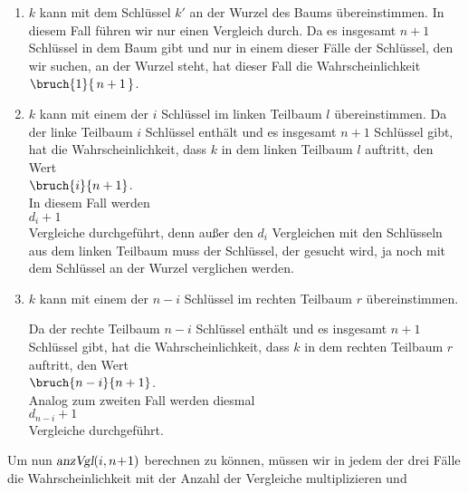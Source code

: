\begin{enumerate}
\item $k$ kann mit dem Schl\"ussel $k'$ an der Wurzel des Baums \"ubereinstimmen.
      In diesem Fall f\"uhren wir nur einen Vergleich durch.  Da es insgesamt
      $n+1$ Schl\"ussel in dem Baum gibt und nur in einem dieser F\"alle
      der Schl\"ussel, den wir suchen, an der Wurzel steht, hat dieser Fall die
      Wahrscheinlichkeit
      \\[0.2cm]
      \hspace*{1.3cm} $\bruch{1}{\,n+1\,}$.

\item $k$ kann mit einem der $i$ Schl\"ussel im linken Teilbaum $l$ \"ubereinstimmen.
      Da  der linke Teilbaum $i$ Schl\"ussel enth\"alt und  es insgesamt
      $n+1$ Schl\"ussel gibt, hat die Wahrscheinlichkeit, dass $k$ in dem linken Teilbaum $l$
      auftritt, den Wert \\[0.2cm]
      \hspace*{1.3cm} $\displaystyle\bruch{i}{n+1}$. \\[0.2cm]
       In diesem Fall werden \\[0.2cm]
      \hspace*{1.3cm} $\displaystyle d_i + 1$ \\[0.2cm]
      Vergleiche durchgef\"uhrt, denn au{\ss}er den $d_i$ Vergleichen mit den Schl\"usseln aus dem
      linken Teilbaum muss der Schl\"ussel, der gesucht wird, ja noch mit dem Schl\"ussel an
      der Wurzel verglichen werden.
\item $k$ kann mit einem der $n-i$ Schl\"ussel im rechten Teilbaum $r$ \"ubereinstimmen.

      Da  der rechte Teilbaum $n-i$ Schl\"ussel enth\"alt und  es insgesamt
      $n+1$ Schl\"ussel gibt, hat die Wahrscheinlichkeit, dass $k$ in dem rechten Teilbaum $r$
      auftritt, den Wert \\[0.2cm]
      \hspace*{1.3cm} $\displaystyle \bruch{n-i}{n+1}$. \\[0.2cm]
      Analog zum zweiten Fall werden diesmal \\[0.2cm]
      \hspace*{1.3cm} $\displaystyle d_{n-i} + 1$ \\[0.2cm]
      Vergleiche durchgef\"uhrt. 
\end{enumerate}
Um nun  $\textsl{anzVgl}(i, n\!+\!1)$ berechnen zu k\"onnen, m\"ussen wir in jedem der drei
F\"alle die Wahrscheinlichkeit mit der Anzahl der Vergleiche multiplizieren und
